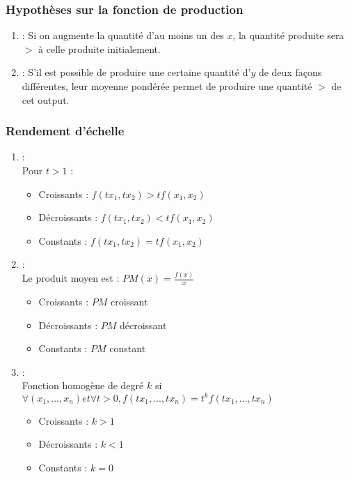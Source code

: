 \subsubsection{Hypothèses sur la fonction de production}

\begin{enumerate}
\item {} : Si on augmente la quantité d'au moins un des $x$, la quantité produite sera $>$ à celle produite initialement.
\item {} : S'il est possible de produire une certaine quantité d'$y$ de deux façons différentes, leur moyenne pondérée permet de produire une quantité $>$ de cet output.
\end{enumerate}

\subsubsection{Rendement d'échelle}

\begin{enumerate}
\item {} :\\
Pour $t > 1$ :
	\begin{itemize}
	\item Croissants : $f(tx_1, tx_2) > tf(x_1, x_2)$
	\item Décroissants : $f(tx_1, tx_2) < tf(x_1, x_2)$
	\item Constants : $f(tx_1, tx_2) = tf(x_1, x_2)$
	\end{itemize}
\item {} :\\
Le produit moyen est : $PM(x) = \frac{f(x)}{x}$
	\begin{itemize}
	\item Croissants : $PM$ croissant
	\item Décroissants : $PM$ décroissant
	\item Constants : $PM$ constant
	\end{itemize}
\item {} :\\
Fonction homogène de degré $k$ si $\forall(x_1, ..., x_n) et \forall t>0, f(tx_1, ..., tx_n) = t^k f(tx_1, ..., tx_n)$
	\begin{itemize}
	\item Croissants : $k > 1$
	\item Décroissants : $k < 1$
	\item Constants : $k = 0$
	\end{itemize}
\end{enumerate}

